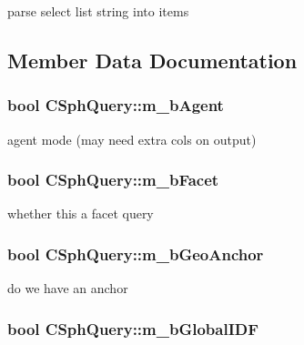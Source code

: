 parse select list string into items 



\subsection{Member Data Documentation}
\hypertarget{classCSphQuery_ae8159385c051f3d4b46df93488cd0c00}{
\subsubsection[{m\-\_\-b\-Agent}]{\setlength{\rightskip}{0pt plus 5cm}bool C\-Sph\-Query\-::m\-\_\-b\-Agent}}\label{classCSphQuery_ae8159385c051f3d4b46df93488cd0c00}


agent mode (may need extra cols on output) 

\hypertarget{classCSphQuery_abf94cbbcea956dbea12220a1f3b85903}{
\subsubsection[{m\-\_\-b\-Facet}]{\setlength{\rightskip}{0pt plus 5cm}bool C\-Sph\-Query\-::m\-\_\-b\-Facet}}\label{classCSphQuery_abf94cbbcea956dbea12220a1f3b85903}


whether this a facet query 

\hypertarget{classCSphQuery_a6cac40b6180ec85cd7f535219fd50300}{
\subsubsection[{m\-\_\-b\-Geo\-Anchor}]{\setlength{\rightskip}{0pt plus 5cm}bool C\-Sph\-Query\-::m\-\_\-b\-Geo\-Anchor}}\label{classCSphQuery_a6cac40b6180ec85cd7f535219fd50300}


do we have an anchor 

\hypertarget{classCSphQuery_a2f65d3d6c473175e9ab10d6d54ef3edf}{
\subsubsection[{m\-\_\-b\-Global\-I\-D\-F}]{\setlength{\rightskip}{0pt plus 5cm}bool C\-Sph\-Query\-::m\-\_\-b\-Global\-I\-D\-F}}\label{classCSphQuery_a2f65d3d6c473175e9ab10d6d54ef3edf}


